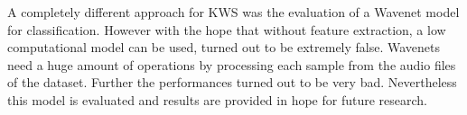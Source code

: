 A completely different approach for KWS was the evaluation of a Wavenet \cite{Oord2016} model for classification.
However with the hope that without feature extraction, a low computational model can be used, turned out to be extremely false.
Wavenets need a huge amount of operations by processing each sample from the audio files of the dataset.
Further the performances turned out to be very bad.
Nevertheless this model is evaluated and results are provided in hope for future research.